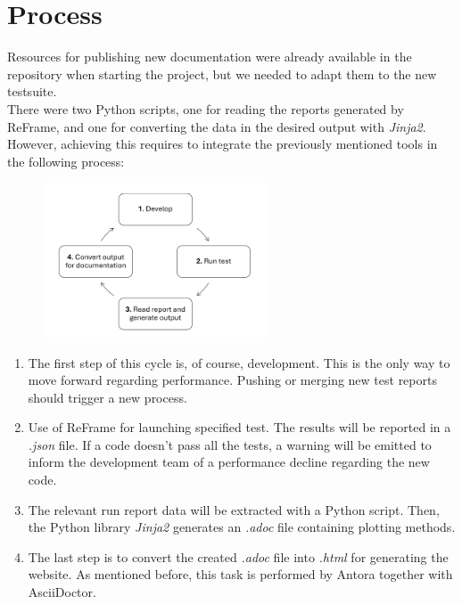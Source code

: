 \documentclass[12pt]{article}
\begin{document}
\section{Process}
Resources for publishing new documentation were already available in the repository when starting the project, but we needed to adapt them to the new testsuite.\\
There were two Python scripts, one for reading the reports generated by ReFrame, and one for converting the data in the desired output with \textit{Jinja2}. \\
However, achieving this requires to integrate the previously mentioned tools in the following process:

\begin{figure}[H]
    \centering
    \includegraphics[width=0.6\textwidth]{../illustrations/process.png}
\end{figure}

\begin{enumerate}
    \item The first step of this cycle is, of course, development. This is the only way to move forward regarding performance. Pushing or merging new test reports should trigger a new process.
    \item Use of ReFrame for launching specified test. The results will be reported in a \textit{.json} file. If a code doesn't pass all the tests, a warning will be emitted to inform the development team of a performance decline regarding the new code.
    \item The relevant run report data will be extracted with a Python script. Then, the Python library \textit{Jinja2}\cite*{Jinja2}  generates an \textit{.adoc} file containing plotting methods.
    \item The last step is to convert the created \textit{.adoc} file into \textit{.html} for generating the website. As mentioned before, this task is performed by Antora together with AsciiDoctor.
    \end{enumerate}
\end{document}
